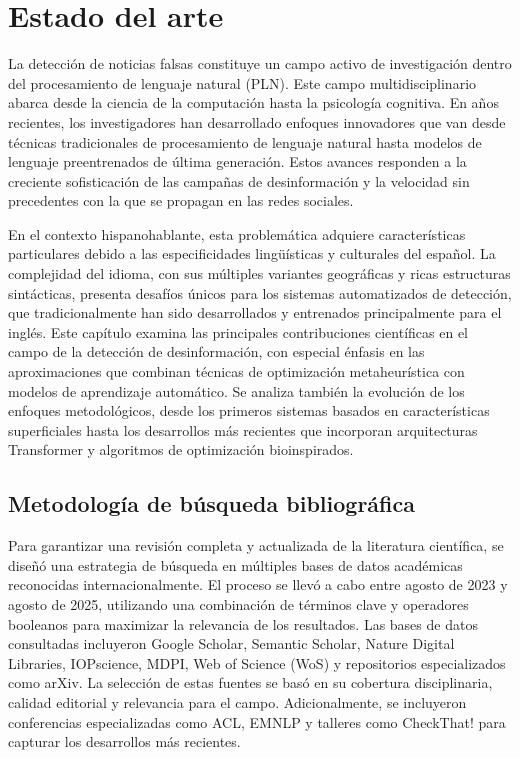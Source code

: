 \chapter{Estado del arte \label{cap:EstadoDelArte}}

La detección de noticias falsas constituye un campo activo de investigación dentro del procesamiento de lenguaje natural (PLN). Este campo multidisciplinario abarca desde la ciencia de la computación hasta la psicología cognitiva. En años recientes, los investigadores han desarrollado enfoques innovadores que van desde técnicas tradicionales de procesamiento de lenguaje natural hasta modelos de lenguaje preentrenados de última generación. Estos avances responden a la creciente sofisticación de las campañas de desinformación y la velocidad sin precedentes con la que se propagan en las redes sociales.

En el contexto hispanohablante, esta problemática adquiere características particulares debido a las especificidades lingüísticas y culturales del español. La complejidad del idioma, con sus múltiples variantes geográficas y ricas estructuras sintácticas, presenta desafíos únicos para los sistemas automatizados de detección, que tradicionalmente han sido desarrollados y entrenados principalmente para el inglés. Este capítulo examina las principales contribuciones científicas en el campo de la detección de desinformación, con especial énfasis en las aproximaciones que combinan técnicas de optimización metaheurística con modelos de aprendizaje automático. Se analiza también la evolución de los enfoques metodológicos, desde los primeros sistemas basados en características superficiales hasta los desarrollos más recientes que incorporan arquitecturas Transformer y algoritmos de optimización bioinspirados.

\section{Metodología de búsqueda bibliográfica}
\label{sec:busqueda_literatura}

Para garantizar una revisión completa y actualizada de la literatura científica, se diseñó una estrategia de búsqueda en múltiples bases de datos académicas reconocidas internacionalmente. El proceso se llevó a cabo entre agosto de 2023 y agosto de 2025, utilizando una combinación de términos clave y operadores booleanos para maximizar la relevancia de los resultados. Las bases de datos consultadas incluyeron Google Scholar, Semantic Scholar, Nature Digital Libraries, IOPscience, MDPI, Web of Science (WoS) y repositorios especializados como arXiv. La selección de estas fuentes se basó en su cobertura disciplinaria, calidad editorial y relevancia para el campo. Adicionalmente, se incluyeron conferencias especializadas como ACL, EMNLP y talleres como CheckThat! para capturar los desarrollos más recientes.

